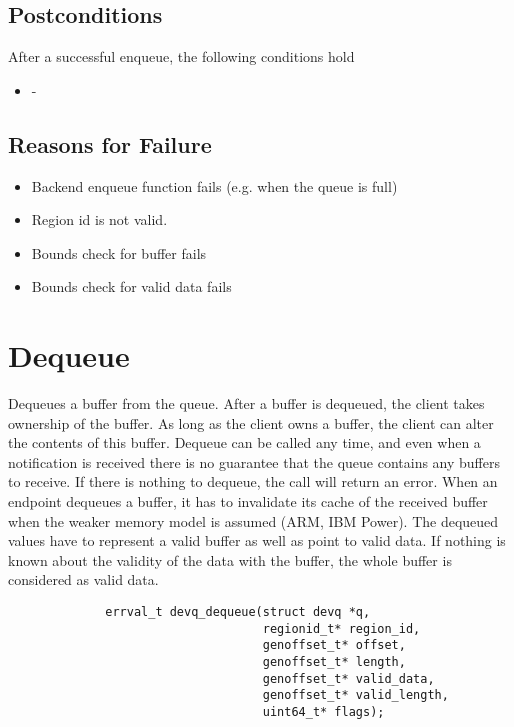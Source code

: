 \documentclass[a4paper,11pt,twoside]{report}
\begin{document}
	\subsection*{Postconditions}
	After a successful enqueue, the following conditions hold
	\begin{itemize}
		\item -
	\end{itemize}
	
	\subsection*{Reasons for Failure}
	\begin{itemize}
		\item Backend enqueue function fails (e.g. when the queue is full)
		\item Region id is not valid.
		\item Bounds check for buffer fails
		\item Bounds check for valid data fails
	\end{itemize}
	
	\section{Dequeue}
	Dequeues a buffer from the queue. After a buffer is dequeued, the client
	takes ownership of the buffer. As long as the client owns a buffer, the
	client can alter the contents of this buffer. Dequeue can be called any time,
	and even when a notification is received there is no guarantee that the queue contains any buffers
	to receive. If there is nothing to dequeue, the call will return an error. When an endpoint
	dequeues a buffer, it has to invalidate its cache of the received buffer when
	the weaker memory model is assumed (ARM, IBM Power). The dequeued values 
	have to represent a valid buffer as well as point to valid data. If nothing 
	is known about the validity of the data with the buffer, the whole buffer 
	is considered as valid data.

	\begin{figure}[h]
		\begin{lstlisting}
		errval_t devq_dequeue(struct devq *q,
		                      regionid_t* region_id,
		                      genoffset_t* offset,
		                      genoffset_t* length,
		                      genoffset_t* valid_data,
		                      genoffset_t* valid_length,
		                      uint64_t* flags);
		\end{lstlisting}
		\label{lst:dequeue}
	\end{figure}
\end{document}
